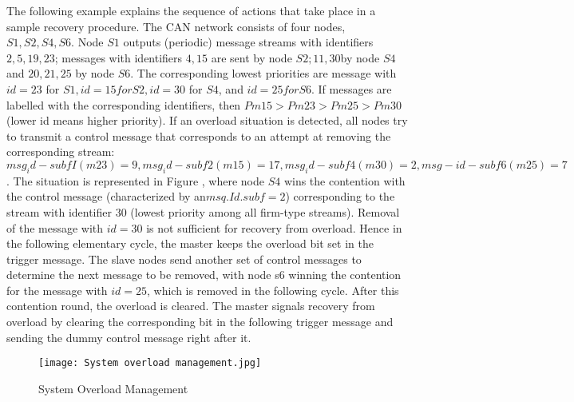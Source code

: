 \documentclass[conference]{IEEEtran}
\begin{document}
The following example explains the sequence of actions that take place in a sample recovery procedure. The CAN network consists of four nodes,$ S1, S2, S4, S6$. Node $S1$ outputs (periodic) message streams with identifiers $2,5,19,23$; messages with identifiers $4,15$ are sent by node $S2; 11,30 $by node $S4$ and $20,21,25$ by node $S6$. 
The corresponding lowest priorities are message with $id=23$ for $S1, id=15 for S2, id=30$ for $S4$, and $id=25 for S6$. If messages are labelled with the corresponding identifiers, then $Pm15>Pm23>Pm25>Pm30$ (lower id means higher priority)\cite{1377703}. If an overload situation is detected, all nodes try to transmit a control message that corresponds to an attempt at removing the corresponding stream:$msg_id−subfI(m23)=9,msg_id−subf2(m15)=17,msg_id−subf4(m30)=2,msg-id−subf6(m25)=7$. The situation is represented in Figure , where node $S4$ wins the contention with the control message (characterized by an$ msq. Id. subf = 2$) corresponding to the stream with identifier $30$ (lowest priority among all firm-type streams). Removal of the message with $id = 30$ is not sufficient for recovery from overload. Hence in the following elementary cycle,\cite{1377703} the master keeps the overload bit set in the trigger message. The slave nodes send another set of control messages to determine the next message to be removed, with node s6 winning the contention for the message with $id = 25$, which is removed in the following cycle. After this contention round, the overload is cleared. The master signals recovery from overload by clearing the corresponding bit in the following trigger message and sending the dummy control message right after it\cite{1377703}.

\begin{figure}[htp]
    \centering
    \texttt{[image: System overload management.jpg]}
    \caption{System Overload Management{ \cite{1377703}}}
    \label{fig:reg-gen}
\end{figure}
\end{document}
